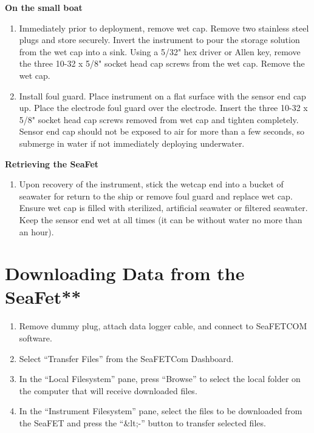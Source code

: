 \documentclass[]{book}
\providecommand{\tightlist}{%
  \setlength{\itemsep}{0pt}\setlength{\parskip}{0pt}}
\begin{document}
\textbf{On the small boat}

\begin{enumerate}
\def\labelenumi{\arabic{enumi}.}
\tightlist
\item
  Immediately prior to deployment, remove wet cap. Remove two stainless steel plugs and store securely. Invert the instrument to pour the storage solution from the wet cap into a sink. Using a 5/32" hex driver or Allen key, remove the three 10-32 x 5/8" socket head cap screws from the wet cap. Remove the wet cap.
\item
  Install foul guard. Place instrument on a flat surface with the sensor end cap up. Place the electrode foul guard over the electrode. Insert the three 10-32 x 5/8" socket head cap screws removed from wet cap and tighten completely. Sensor end cap should not be exposed to air for more than a few seconds, so submerge in water if not immediately deploying underwater.
\end{enumerate}

\textbf{Retrieving the SeaFet}

\begin{enumerate}
\def\labelenumi{\arabic{enumi}.}
\tightlist
\item
  Upon recovery of the instrument, stick the wetcap end into a bucket of seawater for return to the ship or remove foul guard and replace wet cap. Ensure wet cap is filled with sterilized, artificial seawater or filtered seawater. Keep the sensor end wet at all times (it can be without water no more than an hour).
\end{enumerate}

\hypertarget{downloading-data-from-the-seafet}{%
\section{Downloading Data from the SeaFet**}\label{downloading-data-from-the-seafet}}

\begin{enumerate}
\def\labelenumi{\arabic{enumi}.}
\setcounter{enumi}{1}
\item
  Remove dummy plug, attach data logger cable, and connect to SeaFETCOM software.
\item
  Select ``Transfer Files'' from the SeaFETCom Dashboard.
\item
  In the ``Local Filesystem'' pane, press ``Browse'' to select the local folder on the computer that will receive downloaded files.
\item
  In the ``Instrument Filesystem'' pane, select the files to be downloaded from the SeaFET and press the ``\&lt;-'' button to transfer selected files.
\end{enumerate}
\end{document}
